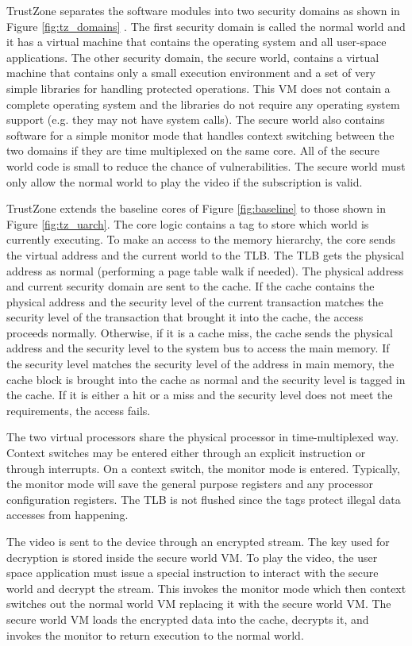     TrustZone separates the software modules into two security domains as shown 
    in Figure \ref{fig:tz_domains} . The first security domain is called the 
    normal world and it has a virtual machine that contains the operating 
    system and all user-space applications. The other security domain, the 
    secure world, contains a virtual machine that contains only a small 
    execution environment and a set of very simple libraries for handling 
    protected operations. This VM does not contain a complete operating system 
    and the libraries do not require any operating system support (e.g. they 
    may not have system calls). The secure world also contains software for a 
    simple monitor mode that handles context switching between the two domains 
    if they are time multiplexed on the same core. All of the secure world code 
    is small to reduce the chance of vulnerabilities. The secure world must 
    only allow the normal world to play the video if the subscription is valid.

    TrustZone extends the baseline cores of Figure \ref{fig:baseline} to
    those shown in Figure \ref{fig:tz_uarch}. The core logic contains a tag to 
    store which world is currently executing. To make an access to the memory 
    hierarchy, the core sends the virtual address and the current world to the 
    TLB. The TLB gets the physical address as normal (performing a page table 
    walk if needed). The physical address and current security domain are sent 
    to the cache. If the cache contains the physical address and the security 
    level of the current transaction matches the security level of the 
    transaction that brought it into the cache, the access proceeds normally.  
    Otherwise, if it is a cache miss, the cache sends the physical address and 
    the security level to the system bus to access the main memory. If the 
    security level matches the security level of the address in main memory, 
    the cache block is brought into the cache as normal and the security level 
    is tagged in the cache. If it is either a hit or a miss and the security 
    level does not meet the requirements, the access fails.

    The two virtual processors share the physical processor in time-multiplexed 
    way. Context switches may be entered either through an explicit instruction 
    or through interrupts. On a context switch, the monitor mode is entered.  
    Typically, the monitor mode will save the general purpose registers and any 
    processor configuration registers. The TLB is not flushed since the tags 
    protect illegal data accesses from happening.

    The video is sent to the device through an encrypted stream. The key used 
    for decryption is stored inside the secure world VM. To play the video, the 
    user space application must issue a special instruction to interact with 
    the secure world and decrypt the stream. This invokes the monitor mode 
    which then context switches out the normal world VM replacing it with the 
    secure world VM. The secure world VM loads the encrypted data into the 
    cache, decrypts it, and invokes the monitor to return execution to the 
    normal world. 
